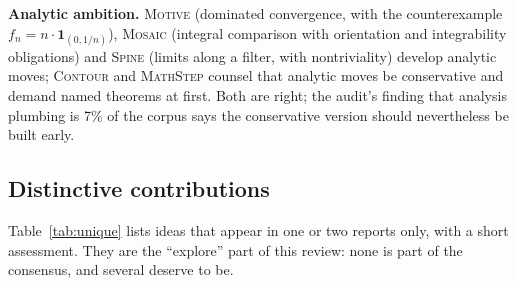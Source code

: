 \documentclass[11pt,a4paper]{article}
\newcommand{\MS}{\textsc{MathStep}}
\newcommand{\Co}{\textsc{Contour}}
\newcommand{\Mo}{\textsc{Mosaic}}
\newcommand{\Mv}{\textsc{Motive}}
\newcommand{\Sp}{\textsc{Spine}}
\theoremstyle{definition}
\begin{document}
\textbf{Analytic ambition.} \Mv{} (dominated convergence, with the counterexample $f_n = n\cdot\mathbf{1}_{(0,1/n)}$), \Mo{} (integral comparison with orientation and integrability obligations) and \Sp{} (limits along a filter, with nontriviality) develop analytic moves; \Co{} and \MS{} counsel that analytic moves be conservative and demand named theorems at first. Both are right; the audit's finding that analysis plumbing is 7\% of the corpus says the conservative version should nevertheless be built early.

\subsection{Distinctive contributions}
Table~\ref{tab:unique} lists ideas that appear in one or two reports only, with a short assessment. They are the ``explore'' part of this review: none is part of the consensus, and several deserve to be.
\end{document}
